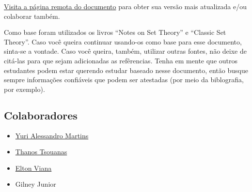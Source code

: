 \documentclass[12pt, a4paper]{article}
\begin{document}
\href{https://github.com/YuriAlessandro/BTI-Documents/blob/master/FMC2/fmc2_un2.tex}{Visita a página remota do documento} para obter sua versão mais atualizada e/ou colaborar também.

Como base foram utilizados os livros ``Notes on Set Theory''\cite{moschovakis2006notes} e ``Classic Set Theory''\cite{goldrei1996classic}. Caso você queira continuar usando-os como base para esse documento, sinta-se a vontade. Caso você queira, também, utilizar outras fontes, não deixe de citá-las para que sejam adicionadas as refêrencias. Tenha em mente que outros estudantes podem estar querendo estudar baseado nesse documento, então busque sempre informações confiáveis que podem ser atestadas (por meio da biblografia, por exemplo).

\subsection{Colaboradores}
\begin{itemize}
\item \href{https://github.com/YuriAlessandro}{Yuri Alessandro Martins}
\item \href{http://www.tsouanas.org/}{Thanos Tsouanas}
\item \href{https://github.com/eltonvs}{Elton Viana}
\item Gilney Junior
\end{itemize}
\clearpage


\end{document}
